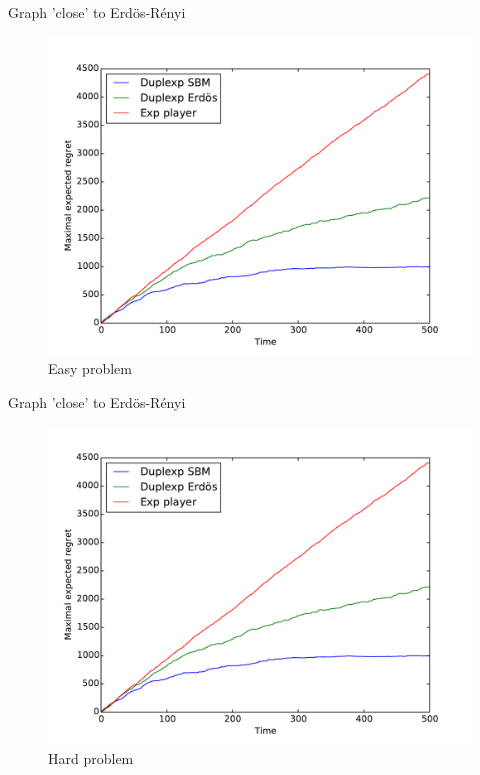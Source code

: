 \documentclass[11pt]{beamer}
\begin{document}
\begin{frame}{Graph 'close' to Erdös-Rényi}
\begin{figure}[ht]
	\centering
	\includegraphics[width=.8\textwidth]{regret_success_easy}
	\caption{Easy problem}
\end{figure}
\end{frame}

\begin{frame}{Graph 'close' to Erdös-Rényi}
\begin{figure}[ht]
	\centering
	\includegraphics[width=.8\textwidth]{regret_success_easy}
	\caption{Hard problem}
\end{figure}
\end{frame}
\end{document}

